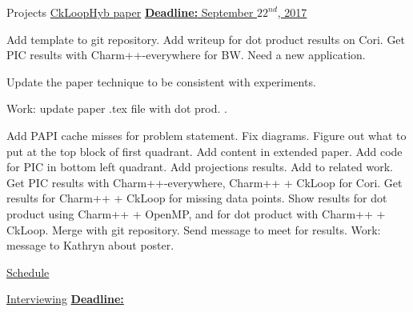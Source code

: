\begin{columns}
\begin{column}{0.10\linewidth}
\begin{block}{Projects}
\underline{CkLoopHyb paper}
\underline{\textbf{Deadline:} September $22^{nd}$, 2017}
\begin{enumerate}
\pitem Add template to git repository.
\pitem Add writeup for dot product results on Cori.
\pitem Get PIC results with Charm++-everywhere for BW.
\pitem Need a new application. 

\ptask Update the paper technique to be consistent with experiments.
 
\ptask Work: update paper .tex file with dot prod. .

\ptask Add PAPI cache misses for problem statement.
\ptask Fix diagrams.
\ptask Figure out what to put at the top block of first quadrant.
\ptask Add content in extended paper.
\ptask Add code for PIC in bottom left quadrant.
\ptask Add projections results.
\ptask Add to related work.
\ptask Get PIC results with Charm++-everywhere, Charm++ + CkLoop for Cori.
\ptask Get results for Charm++ + CkLoop for missing data points.
\ptask Show results for dot product using Charm++ + OpenMP, and for
dot product with Charm++ + CkLoop.
\pitem Merge with git repository.
\pitem Send message to meet for results.
\pitem Work: message to Kathryn about poster.
\end{enumerate}

\underline{Schedule} \\ 
\begin{enumerate}
\pitem 
\end{enumerate} 
\end{block} 

\underline{Interviewing} 
\underline{\textbf{Deadline:}} 
\begin{enumerate}
\pitem 
\pitem 
\end{enumerate} 




\end{column}
\end{columns}
